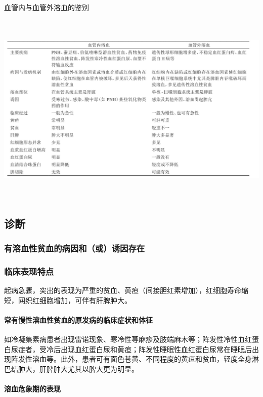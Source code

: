 \begin{table}[htbp]
\centering
\caption{血管内与血管外溶血的鉴别}
\label{tab51-1}
\includegraphics[width=6.79167in,height=3.69792in]{./images/Image00178.jpg}
\end{table}

\subsection{诊断}

\subsubsection{有溶血性贫血的病因和（或）诱因存在}

\subsubsection{临床表现特点}

起病急骤，突出的表现为严重的贫血、黄疸（间接胆红素增加），红细胞寿命缩短，网织红细胞增加，可伴有肝脾肿大。

\paragraph{常有慢性溶血性贫血的原发病的临床症状和体征}

如冷凝集素病患者出现雷诺现象、寒冷性荨麻疹及肢端麻木等；阵发性冷性血红蛋白尿症者，受冷后出现血红蛋白尿和黄疸；阵发性睡眠性血红蛋白尿常在睡眠后出现阵发性溶血等。此外，患者可有面色苍黄、不同程度的黄疸和贫血，轻度全身淋巴结肿大，肝脾肿大尤其以脾大更为明显。

\paragraph{溶血危象期的表现}

